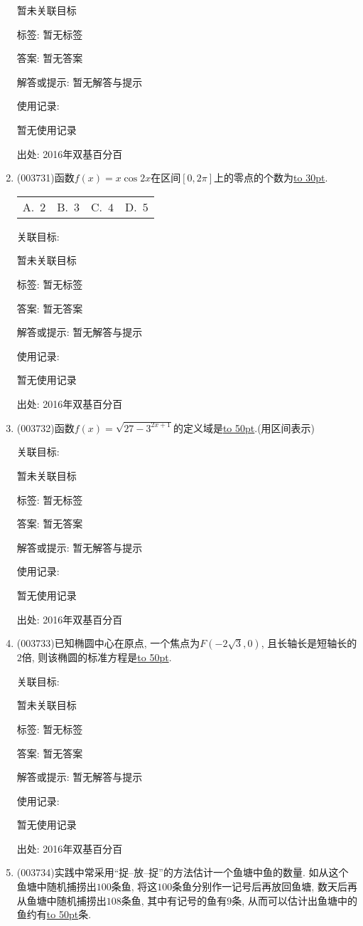 \documentclass[10pt,a4paper]{article}
\newcommand{\blank}[1]{\underline{\hbox to #1pt{}}}
\newcommand{\fourch}[4]{\par\begin{tabular}{p{.23\textwidth}p{.23\textwidth}p{.23\textwidth}p{.23\textwidth}}
A.~#1 &B.~#2& C.~#3& D.~#4
\end{tabular}}
\begin{document}
\begin{enumerate}[1.]
暂未关联目标



标签: 暂无标签

答案: 暂无答案

解答或提示: 暂无解答与提示

使用记录:

暂无使用记录


出处: 2016年双基百分百
\item { (003731)}函数$f(x)=x\cos 2x$在区间$[0,2\pi]$上的零点的个数为\blank{30}.
\fourch{$2$}{$3$}{$4$}{$5$}


关联目标:

暂未关联目标



标签: 暂无标签

答案: 暂无答案

解答或提示: 暂无解答与提示

使用记录:

暂无使用记录


出处: 2016年双基百分百
\item { (003732)}函数$f(x)=\sqrt{27-3^{2x+1}}$的定义域是\blank{50}.(用区间表示)


关联目标:

暂未关联目标



标签: 暂无标签

答案: 暂无答案

解答或提示: 暂无解答与提示

使用记录:

暂无使用记录


出处: 2016年双基百分百
\item { (003733)}已知椭圆中心在原点, 一个焦点为$F(-2\sqrt{3},0)$, 且长轴长是短轴长的$2$倍, 则该椭圆的标准方程是\blank{50}.


关联目标:

暂未关联目标



标签: 暂无标签

答案: 暂无答案

解答或提示: 暂无解答与提示

使用记录:

暂无使用记录


出处: 2016年双基百分百
\item { (003734)}实践中常采用``捉--放--捉''的方法估计一个鱼塘中鱼的数量. 如从这个鱼塘中随机捕捞出$100$条鱼, 将这$100$条鱼分别作一记号后再放回鱼塘, 数天后再从鱼塘中随机捕捞出$108$条鱼, 其中有记号的鱼有$9$条, 从而可以估计出鱼塘中的鱼约有\blank{50}条.



\end{enumerate}
\end{document}
